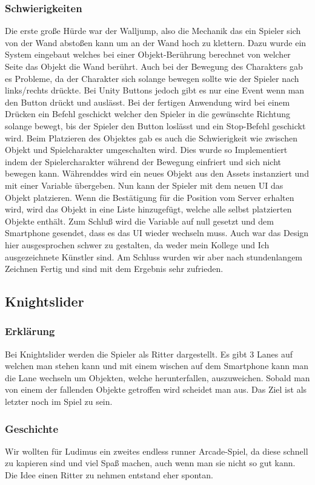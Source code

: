 \subsubsection{Schwierigkeiten}
Die erste große Hürde war der Walljump, also die Mechanik das ein Spieler sich von der Wand abstoßen kann um an der Wand hoch zu klettern. Dazu wurde ein System eingebaut welches bei einer Objekt-Berührung berechnet von welcher Seite das Objekt die Wand berührt. Auch bei der Bewegung des Charakters gab es Probleme, da der Charakter sich solange bewegen sollte wie der Spieler nach links/rechts drückte. Bei Unity Buttons jedoch gibt es nur eine Event wenn man den Button drückt und auslässt. Bei der fertigen Anwendung wird bei einem Drücken ein Befehl geschickt welcher den Spieler in die gewünschte Richtung solange bewegt, bis der Spieler den Button loslässt und ein Stop-Befehl geschickt wird. Beim Platzieren des Objektes gab es auch die Schwierigkeit wie zwischen Objekt und Spielcharakter umgeschalten wird. Dies wurde so Implementiert indem der Spielercharakter während der Bewegung einfriert und sich nicht bewegen kann. Währenddes wird ein neues Objekt aus den Assets instanziert und mit einer Variable übergeben. Nun kann der Spieler mit dem neuen UI das Objekt platzieren. Wenn die Bestätigung für die Position vom Server erhalten wird, wird das Objekt in eine Liste hinzugefügt, welche alle selbst platzierten Objekte enthält. Zum Schluß wird die Variable auf null gesetzt und dem Smartphone gesendet, dass es das UI wieder wechseln muss. Auch war das Design hier ausgesprochen schwer zu gestalten, da weder mein Kollege und Ich ausgezeichnete Künstler sind. Am Schluss wurden wir aber nach stundenlangem Zeichnen Fertig und sind mit dem Ergebnis sehr zufrieden.
\subsection{Knightslider}
\subsubsection{Erklärung}
Bei Knightslider werden die Spieler als Ritter dargestellt. Es gibt 3 Lanes auf welchen man stehen kann und mit einem wischen auf dem Smartphone kann man die Lane wechseln um Objekten, welche herunterfallen, auszuweichen. Sobald man von einem der fallenden Objekte getroffen wird scheidet man aus. Das Ziel ist als letzter noch im Spiel zu sein.
\subsubsection{Geschichte}
Wir wollten für Ludimus ein zweites endless runner Arcade-Spiel, da diese schnell zu kapieren sind und viel Spaß machen, auch wenn man sie nicht so gut kann. Die Idee einen Ritter zu nehmen entstand eher spontan.

